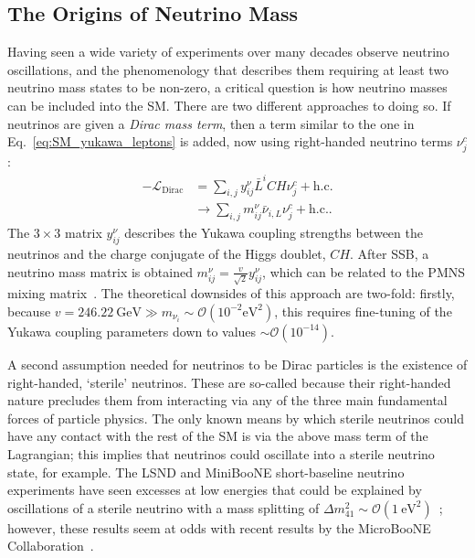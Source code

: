 \subsection{The Origins of Neutrino Mass}
Having seen a wide variety of experiments over many decades observe neutrino oscillations, and the phenomenology that describes them requiring at least two neutrino mass states to be non-zero, a critical question is how neutrino masses can be included into the SM. There are two different approaches to doing so. If neutrinos are given a \textit{Dirac mass term}, then a term similar to the one in Eq.~\ref{eq:SM_yukawa_leptons} is added, now using right-handed neutrino terms $\nu^{c}_{j}$:
\begin{align}
    -\mathcal{L}_{\mathrm{Dirac}} &= \sum_{i,j}y^{\nu}_{ij}\bar{L}^{i}CH\nu^{c}_{j} + \mathrm{ h.c.}\\
                              &\to \sum_{i,j}m^{\nu}_{ij}\bar{\nu}_{i,L}\nu^{c}_{j} + \mathrm{ h.c.}.
\end{align}
The $3\times3$ matrix $y^{\nu}_{ij}$ describes the Yukawa coupling strengths between the neutrinos and the charge conjugate of the Higgs doublet, $CH$. After SSB, a neutrino mass matrix is obtained $m^{\nu}_{ij} = \frac{v}{\sqrt{2}}y^{\nu}_{ij}$, which can be related to the PMNS mixing matrix~\cite{deppischChapterNeutrinosStandard2019}. %
The theoretical downsides of this approach are two-fold: firstly, because $v = \SI{246.22}{\GeV} \gg m_{\nu_{i}}\sim \mathcal{O}(10^{-2}\si{\eV\squared})$, this requires fine-tuning of the Yukawa coupling parameters down to values $\sim\mathcal{O}(10^{-14})$.

A second assumption needed for neutrinos to be Dirac particles is the existence of right-handed, `sterile' neutrinos. These are so-called because their right-handed nature precludes them from interacting via any of the three main fundamental forces of particle physics. The only known means by which sterile neutrinos could have any contact with the rest of the SM is via the above mass term of the Lagrangian; this implies that neutrinos could oscillate into a sterile neutrino state, for example. The LSND and MiniBooNE short-baseline neutrino experiments have seen excesses at low energies that could be explained by oscillations of a sterile neutrino with a mass splitting of $\Delta m^{2}_{41}\sim\mathcal{O}(\SI{1}{\eV\squared})$~\cite{aguilarEvidenceNeutrinoOscillations2001,aguilar-arevaloUpdatedMiniBooNENeutrino2021}; %
however, these results seem at odds with recent results by the MicroBooNE Collaboration~\cite{abratenkoFirstConstraintsLight2023}. %

